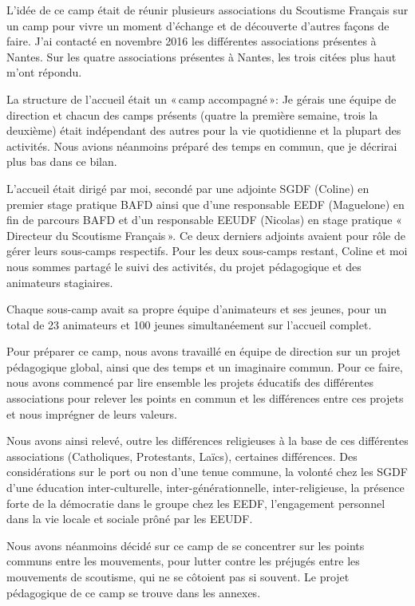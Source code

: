 \documentclass[titlepage,11pt,a4paper]{article}
\begin{document}
L'idée de ce camp était de réunir plusieurs associations du Scoutisme Français sur un camp
pour vivre un moment d'échange et de découverte d'autres façons de faire. J'ai contacté
en novembre 2016 les différentes associations présentes à Nantes. Sur les quatre associations
présentes à Nantes, les trois citées plus haut m'ont répondu.


La structure de l'accueil était un «\,camp accompagné\,»: Je gérais une équipe de
direction et chacun des camps présents (quatre la première semaine, trois la deuxième)
était indépendant des autres pour la vie quotidienne et la plupart des activités. Nous
avions néanmoins préparé des temps en commun, que je décrirai plus bas dans ce bilan.

L'accueil était dirigé par moi, secondé par une adjointe SGDF (Coline) en premier stage pratique BAFD
ainsi que d'une responsable EEDF (Maguelone) en fin de parcours BAFD et d'un responsable
EEUDF (Nicolas) en stage pratique «\,Directeur du Scoutisme Français\,».
Ce deux derniers adjoints avaient pour rôle de gérer leurs sous-camps respectifs.
Pour les deux sous-camps restant, Coline et moi nous sommes partagé le suivi des activités, du
projet pédagogique et des animateurs stagiaires.

Chaque sous-camp avait sa propre équipe d'animateurs et ses jeunes, pour un total de 23
animateurs et 100 jeunes simultanéement sur l'accueil complet.

Pour préparer ce camp, nous avons travaillé en équipe de direction sur un projet
pédagogique global, ainsi que des temps et un imaginaire commun. Pour ce faire, nous avons
commencé par lire ensemble les projets éducatifs des différentes associations pour relever
les points en commun et les différences entre ces projets et nous imprégner de leurs
valeurs.

Nous avons ainsi relevé, outre les différences religieuses à la base de ces différentes
associations (Catholiques, Protestants, Laïcs), certaines différences. Des considérations sur
le port ou non d'une tenue commune, la volonté chez les SGDF d'une éducation
inter-culturelle, inter-générationnelle, inter-religieuse, la présence forte de la
démocratie dans le groupe chez les EEDF, l'engagement personnel dans la vie locale et
sociale prôné par les EEUDF.

Nous avons néanmoins décidé sur ce camp de se concentrer sur les points communs entre les
mouvements, pour lutter contre les préjugés entre les mouvements de scoutisme, qui ne se
côtoient pas si souvent. Le projet pédagogique de ce camp se trouve dans les annexes.
\end{document}
